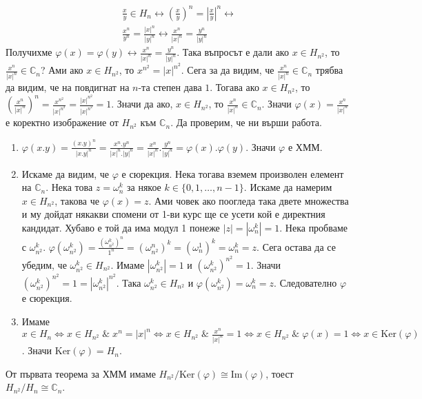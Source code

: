 \documentclass[12pt]{article}
\begin{document}
\begin{enumerate}[label=\alph*)]
\begin{align*}
        \displaystyle\frac{x}{y} \in H_n \longleftrightarrow 
        \left(\displaystyle\frac{x}{y}\right)^n = \left|\displaystyle\frac{x}{y}\right|^n \longleftrightarrow \\
        \displaystyle\frac{x^n}{y^n} = \displaystyle\frac{|x|^n}{|y|^n} \longleftrightarrow
        \displaystyle\frac{x^n}{|x|^n} = \displaystyle\frac{y^n}{|y|^n}
    \end{align*}
    Получихме \(\varphi(x) = \varphi(y) \longleftrightarrow \displaystyle\frac{x^n}{|x|^n} = \displaystyle\frac{y^n}{|y|^n}\).
    Така въпросът е дали ако \(x \in H_{n^2}\), то \(\displaystyle\frac{x^n}{|x|^n} \in \mathbb{C}_n\)?
    Ами ако \(x \in H_{n^2}\), то \(x^{n^2} = |x|^{n^2}\).
    Сега за да видим, че \(\displaystyle\frac{x^n}{|x|^n} \in \mathbb{C}_n\)
    трябва да видим, че на повдигнат на \(n\)-та степен дава \(1\).
    Тогава ако \(x \in H_{n^2}\), то \(\left(\displaystyle\frac{x^n}{|x|^n}\right)^n =
    \displaystyle\frac{x^{n^2}}{|x|^{n^2}} =
    \displaystyle\frac{|x|^{n^2}}{|x|^{n^2}} = 1\).
    Значи да ако, \(x \in H_{n^2}\), то \(\displaystyle\frac{x^n}{|x|^n} \in \mathbb{C}_n\).
    Значи \(\varphi(x) = \displaystyle\frac{x^n}{|x|^n}\) е коректно изображение от \(H_{n^2}\) към \(\mathbb{C}_n\). Да проверим, че ни върши работа.
    \begin{enumerate}
        \item \(\varphi(x.y) = \displaystyle\frac{(x.y)^n}{|x.y|^n} = \displaystyle\frac{x^n.y^n}{|x|^n.|y|^n} = \displaystyle\frac{x^n}{|x|^n}. \displaystyle\frac{y^n}{|y|^n} = \varphi(x) . \varphi(y)\). Значи \(\varphi\) е ХММ.
        \item Искаме да видим, че \(\varphi\) е сюрекция.
        Нека тогава вземем произволен елемент на \(\mathbb{C}_n\).
        Нека това \(z = \omega_n^k\) за някое \(k \in \{0, 1, \dots, n - 1\}\).
        Искаме да намерим \(x \in H_{n^2}\), такова че \(\varphi(x) = z\).
        Ами човек ако поогледа така двете множества и му дойдат някакви спомени от 1-ви курс ще се усети кой е директния кандидат. Хубаво е той да има модул 1 понеже \(|z| = |\omega_n^k| = 1\). Нека пробваме с \(\omega_{n^2}^k\).
        \(\varphi(\omega_{n^2}^k) = \displaystyle\frac{(\omega_{n^2}^k)^n}{1^n} = (\omega_{n^2}^n)^k = (\omega_n^1)^k = \omega_n^k = z\).
        Сега остава да се убедим, че \(\omega_{n^2}^k \in H_{n^2}\).
        Имаме \(|\omega_{n^2}^k| = 1\) и \((\omega_{n^2}^k)^{n^2} = 1\).
        Значи \((\omega_{n^2}^k)^{n^2} = 1 = |\omega_{n^2}^k|^{n^2}\).
        Така \(\omega_{n^2}^k \in H_{n^2}\) и \(\varphi(\omega_{n^2}^k) = \omega_n^k = z\). Следователно \(\varphi\) е сюрекция.
        \item Имаме \(x \in H_n \iff x \in H_{n^2} \; \& \; x^n = |x|^n
        \iff x \in H_{n^2} \; \& \; \displaystyle\frac{x^n}{|x|^n} = 1 \iff
        x \in H_{n^2} \; \& \; \varphi(x) = 1 \iff x \in \mathrm{Ker}(\varphi)\).
        Значи \(\mathrm{Ker}(\varphi) = H_n\).
    \end{enumerate}
    От първата теорема за ХММ имаме \(H_{n^2} / \mathrm{Ker}(\varphi) \cong \mathrm{Im}(\varphi)\), тоест \(H_{n^2}  / H_{n}  \cong \mathbb{C}_n\).
\end{enumerate}
\end{document}

